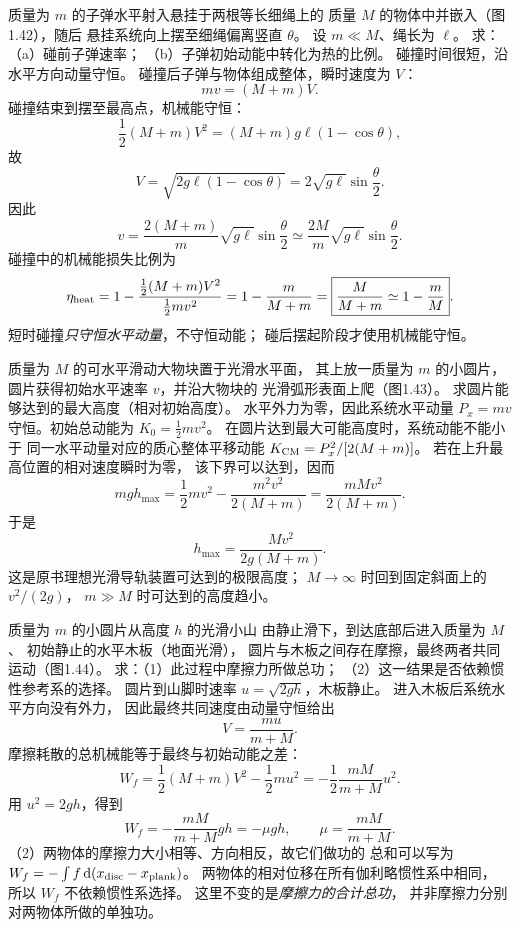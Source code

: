 质量为 $m$ 的子弹水平射入悬挂于两根等长细绳上的
质量 $M$ 的物体中并嵌入（图1.42），随后
悬挂系统向上摆至细绳偏离竖直 $\theta$。
设 $m\ll M$、绳长为 $\ell$。
求：（a）碰前子弹速率；
（b）子弹初始动能中转化为热的比例。
\exsolution
碰撞时间很短，沿水平方向动量守恒。
碰撞后子弹与物体组成整体，瞬时速度为 $V$：
\[
mv=(M+m)V.
\]
碰撞结束到摆至最高点，机械能守恒：
\[
\frac12(M+m)V^2=(M+m)g\ell(1-\cos\theta),
\]
故
\[
V=\sqrt{2g\ell(1-\cos\theta)}
=2\sqrt{g\ell}\sin\frac\theta2.
\]
因此
\[
\boxed{v=\frac{2(M+m)}m\sqrt{g\ell}
\sin\frac\theta2
\simeq\frac{2M}{m}\sqrt{g\ell}\sin\frac\theta2}.
\]
碰撞中的机械能损失比例为
\[
\eta_{\rm heat}=
1-\frac{\tfrac12(M+m)V^2}{\tfrac12mv^2}
=1-\frac{m}{M+m}
=\boxed{\frac{M}{M+m}\simeq1-\frac mM}.
\]
\excheck 短时碰撞\emph{只守恒水平动量}，不守恒动能；
碰后摆起阶段才使用机械能守恒。

质量为 $M$ 的可水平滑动大物块置于光滑水平面，
其上放一质量为 $m$ 的小圆片，
圆片获得初始水平速率 $v$，并沿大物块的
光滑弧形表面上爬（图1.43）。
求圆片能够达到的最大高度（相对初始高度）。
\exsolution
水平外力为零，因此系统水平动量
$P_x=mv$ 守恒。初始总动能为
$K_0=\tfrac12mv^2$。
在圆片达到最大可能高度时，系统动能不能小于
同一水平动量对应的质心整体平移动能
$K_{\rm CM}=P_x^2/[2(M+m)]$。
若在上升最高位置的相对速度瞬时为零，
该下界可以达到，因而
\[
mgh_{\max}=
\frac12mv^2-\frac{m^2v^2}{2(M+m)}
=\frac{mMv^2}{2(M+m)}.
\]
于是
\[
\boxed{h_{\max}=\frac{Mv^2}{2g(M+m)}}.
\]
\excheck 这是原书理想光滑导轨装置可达到的极限高度；
$M\to\infty$ 时回到固定斜面上的 $v^2/(2g)$，
$m\gg M$ 时可达到的高度趋小。

质量为 $m$ 的小圆片从高度 $h$ 的光滑小山
由静止滑下，到达底部后进入质量为 $M$、
初始静止的水平木板（地面光滑），
圆片与木板之间存在摩擦，最终两者共同运动（图1.44）。
求：（1）此过程中摩擦力所做总功；
（2）这一结果是否依赖惯性参考系的选择。
\exsolution
圆片到山脚时速率
$u=\sqrt{2gh}$，木板静止。
进入木板后系统水平方向没有外力，
因此最终共同速度由动量守恒给出
\[
V=\frac{mu}{m+M}.
\]
摩擦耗散的总机械能等于最终与初始动能之差：
\[
W_f=\frac12(M+m)V^2-\frac12mu^2
=-\frac12\frac{mM}{m+M}u^2.
\]
用 $u^2=2gh$，得到
\[
\boxed{W_f=-\frac{mM}{m+M}gh=-\mu gh},
\qquad \mu=\frac{mM}{m+M}.
\]
（2）两物体的摩擦力大小相等、方向相反，故它们做功的
总和可以写为
$W_f=-\int f\,\mathrm d(x_{\rm disc}-x_{\rm plank})$。
两物体的相对位移在所有伽利略惯性系中相同，
所以 $\boxed{W_f\text{ 不依赖惯性系选择}}$。
\excheck 这里不变的是\emph{摩擦力的合计总功}，
并非摩擦力分别对两物体所做的单独功。

